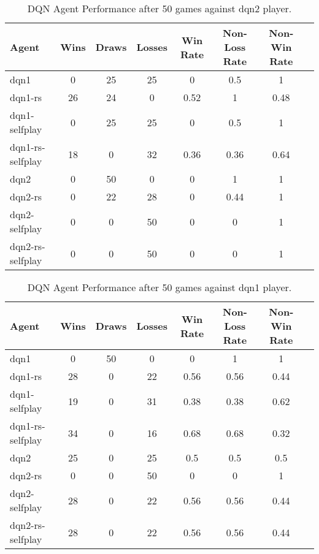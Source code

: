 \documentclass[../report.tex]{subfiles}
\begin{document}
\begin{table}[!htbp]
    \centering
    \caption{DQN Agent Performance after 50 games against dqn2 player.}\label{table:dqns-v-dqn2}
    \begin{tabular}{lccccccc}
        \toprule
        Agent            & Wins & Draws & Losses & Win Rate & Non-Loss Rate & Non-Win Rate \\
        \midrule
        dqn1              & 0    & 25    & 25     & 0        & 0.5           & 1            \\
        dqn1-rs           & 26   & 24    & 0      & 0.52     & 1             & 0.48         \\
        dqn1-selfplay     & 0    & 25    & 25     & 0        & 0.5           & 1            \\
        dqn1-rs-selfplay  & 18   & 0     & 32     & 0.36     & 0.36          & 0.64         \\
        dqn2             & 0    & 50    & 0      & 0        & 1             & 1            \\
        dqn2-rs          & 0    & 22    & 28     & 0        & 0.44          & 1            \\
        dqn2-selfplay    & 0    & 0     & 50     & 0        & 0             & 1            \\
        dqn2-rs-selfplay & 0    & 0     & 50     & 0        & 0             & 1            \\
        \bottomrule
    \end{tabular}
\end{table}

\begin{table}[!htbp]
    \centering
    \caption{DQN Agent Performance after 50 games against dqn1 player.}\label{table:dqns-v-dqn1}
    \begin{tabular}{lccccccc}
        \toprule
        Agent            & Wins & Draws & Losses & Win Rate & Non-Loss Rate & Non-Win Rate \\
        \midrule
        dqn1              & 0    & 50    & 0      & 0        & 1             & 1            \\
        dqn1-rs           & 28   & 0     & 22     & 0.56     & 0.56          & 0.44         \\
        dqn1-selfplay     & 19   & 0     & 31     & 0.38     & 0.38          & 0.62         \\
        dqn1-rs-selfplay  & 34   & 0     & 16     & 0.68     & 0.68          & 0.32         \\
        dqn2             & 25   & 0     & 25     & 0.5      & 0.5           & 0.5          \\
        dqn2-rs          & 0    & 0     & 50     & 0        & 0             & 1            \\
        dqn2-selfplay    & 28   & 0     & 22     & 0.56     & 0.56          & 0.44         \\
        dqn2-rs-selfplay & 28   & 0     & 22     & 0.56     & 0.56          & 0.44         \\
        \bottomrule
    \end{tabular}
\end{table}
\end{document}
